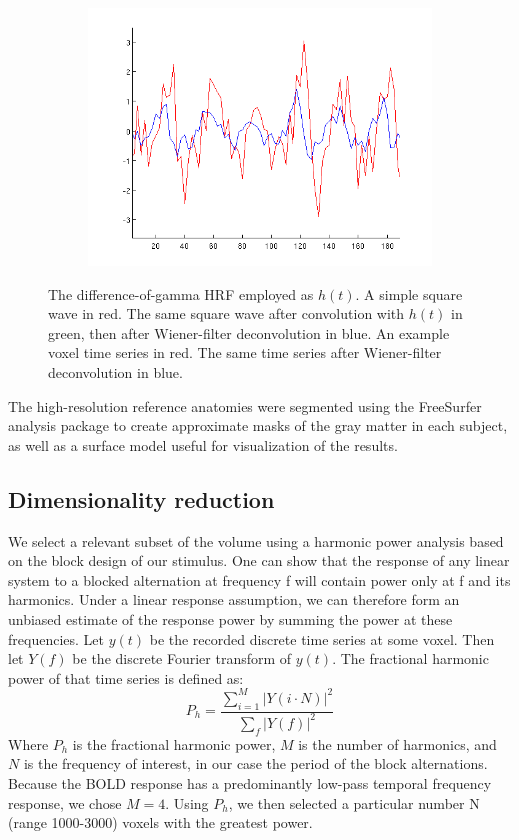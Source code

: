 \documentclass[preprint,authoryear,12pt]{elsarticle}
\begin{document}
\begin{figure}
\begin{subfigure}{0.4\textwidth}
\includegraphics[width=\textwidth]{figures/wiener-voxel}
\caption{}
\label{fig:wiener-voxel}
\end{subfigure}
\caption{
 The difference-of-gamma HRF employed as $h(t)$. 
 A simple square wave in red. 
The same square wave after convolution with $h(t)$ in green, then after Wiener-filter deconvolution in blue. 
 An example voxel time series in red. 
The same time series after Wiener-filter deconvolution in blue.}
\label{fig:wiener-deconvolution}
\end{figure}

The high-resolution reference anatomies were segmented using the FreeSurfer analysis package \citep{FreeSurfer} to create approximate masks of the gray matter in each subject, as well as a surface model useful for visualization of the results.

\subsection{Dimensionality reduction}
We select a relevant subset of the volume using a harmonic power analysis based on the block design of our stimulus. 
One can show that the response of any linear system to a blocked alternation at frequency f will contain power only at f and its harmonics. 
Under a linear response assumption, we can therefore form an unbiased estimate of the response power by summing the power at these frequencies. 
Let $y(t)$ be the recorded discrete time series at some voxel.
Then let $Y(f)$ be the discrete Fourier transform of $y(t)$.
The fractional harmonic power of that time series is defined as:
\begin{equation}
P_h = \frac{\sum_{i = 1}^{M}{\left|Y(i \cdot N)\right|^{2}}}{\sum_{f}{\left|Y(f)\right|^{2}}}
\end{equation}
Where $P_h$ is the fractional harmonic power, $M$ is the number of harmonics, and $N$ is the frequency of interest, in our case the period of the block alternations. 
Because the BOLD response has a predominantly low-pass temporal frequency response, we chose $M = 4$. 
Using $P_h$, we then selected a particular number N (range 1000-3000) voxels with the greatest power. 
\end{document}
